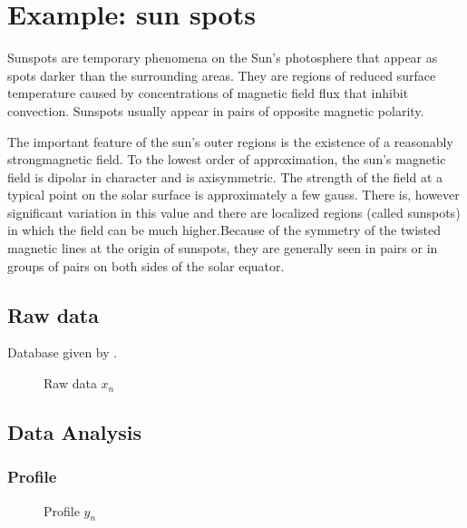 \section{Example: sun spots}
\graphicspath{{../sunSpots/img/}}
Sunspots are temporary phenomena on the Sun's photosphere that appear as spots darker than the surrounding areas. They are regions of reduced surface temperature caused by concentrations of magnetic field flux that inhibit convection. Sunspots usually appear in pairs of opposite magnetic polarity.

The important feature of the sun’s outer regions is the existence of a reasonably strongmagnetic field. To the lowest order of approximation, the sun’s magnetic field is dipolar in character and is axisymmetric. The strength of the field at a typical point on the solar surface is approximately a few gauss. There is, however significant variation in this value and there are localized regions (called sunspots) in which the field can be much higher.Because of the symmetry of the twisted magnetic lines at the origin of sunspots, they are generally seen in pairs or in groups of pairs on both sides of the solar equator. 

\subsection{Raw data}
Database given by \cite{sidc}. 

\begin{figure}[H]
	\centering
	\begin{subfigure}{\textwidth}
		
	\end{subfigure}

	\begin{subfigure}{\textwidth}
		
	\end{subfigure}
	\caption{Raw data $x_n$}
\end{figure}

\subsection{Data Analysis}

\subsubsection{Profile}


\begin{figure}[H]
	\centering
	\begin{subfigure}{\textwidth}
		
	\end{subfigure}

	\begin{subfigure}{\textwidth}
		
	\end{subfigure}
	\caption{Profile $y_n$}
\end{figure}

